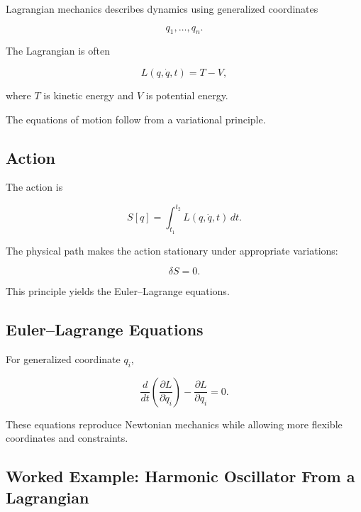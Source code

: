 Lagrangian mechanics describes dynamics using generalized coordinates

\[
q_1,\ldots,q_n.
\]

The Lagrangian is often

\[
\boxed{
L(q,\dot q,t)
=
T-V,
}
\]

where \(T\) is kinetic energy and \(V\) is potential energy.

The equations of motion follow from a variational principle.

\subsection{Action}
\label{subsec:physical-action}

The action is

\[
\boxed{
S[q]
=
\int_{t_1}^{t_2}
L(q,\dot q,t)\,dt.
}
\]

The physical path makes the action stationary under appropriate variations:

\[
\boxed{
\delta S=0.
}
\]

This principle yields the Euler--Lagrange equations.

\subsection{Euler--Lagrange Equations}
\label{subsec:physical-euler-lagrange}

For generalized coordinate \(q_i\),

\[
\boxed{
\frac{d}{dt}
\left(
\frac{\partial L}{\partial\dot q_i}
\right)
-
\frac{\partial L}{\partial q_i}
=
0.
}
\]

These equations reproduce Newtonian mechanics while allowing more flexible
coordinates and constraints.

\subsection{Worked Example: Harmonic Oscillator From a Lagrangian}
\label{subsec:worked-lagrangian-oscillator}

